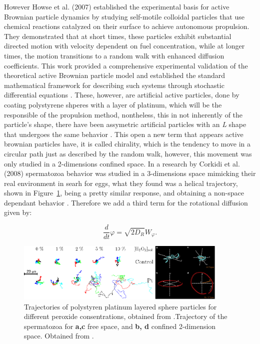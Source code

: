 However Howse et al. (2007) established the experimental basis for active Brownian particle dynamics by studying self-motile colloidal particles that use chemical reactions catalyzed on their surface to achieve autonomous propulsion. They demonstrated that at short times, these particles exhibit substantial directed motion with velocity dependent on fuel concentration, while at longer times, the motion transitions to a random walk with enhanced diffusion coefficients. This work provided a comprehensive experimental validation of the theoretical active Brownian particle model and established the standard mathematical framework for describing such systems through stochastic differential equations \cite{howse2007self, palacci2010sedimentation}. These, however, are artificial active particles, done by coating polystyrene shperes with a layer of platinum, which will be the responsible of the propulsion method, nontheless, this in not inherently of the particle's shape, there have been assymetric artificial particles with an \textit{L} shape that undergoes the same behavior \cite{kummel2013circular}. This open a new term that appears active brownian particles have, it is called chirality, which is the tendency to move in a circular path just as described by the random walk, however, this movement was only studied in a 2-dimensions confined space. In a research by Corkidi et al. (2008) spermatozoa behavior was studied in a 3-dimensions space mimicking their real environment in searh for eggs, what they found was a helical trajectory, shown in Figure~\ref{fig:corkidiexperiment}, being a pretty similar response, and obtaining a non-space dependant behavior \cite{corkidi2008tracking}. Therefore we add a third term for the rotational diffusion given by: 

\begin{equation}
  \frac{d}{dt}{\varphi} = \sqrt{2D_R}W _{\varphi}.
  \label{eq:rotationaldiffusion}
\end{equation}

\begin{figure}[h]
  \begin{center}
    \includegraphics[width=0.90\textwidth]{figures/randomwalk.pdf}
  \end{center}
  \caption[Random Walk for active brownian particles.]{Trajectories of polystyren platinum layered sphere particles for different peroxide consentrations, obtained from \cite{howse2007self}.Trajectory of the spermatozoa for \textbf{a,c} free space, and \textbf{b, d} confined 2-dimension space. Obtained from \cite{corkidi2008tracking}.}\label{fig:corkidiexperiment}
\end{figure}



